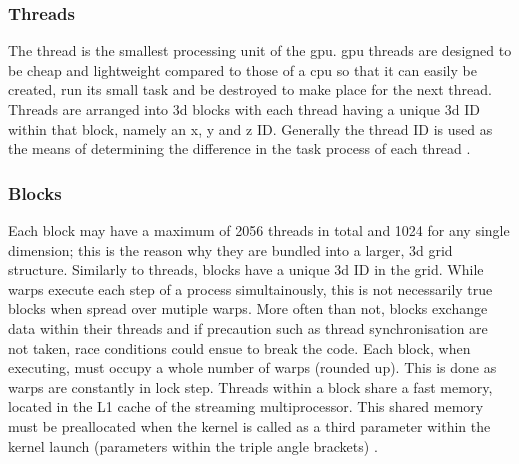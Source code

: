 \subsubsection{Threads}\label{gpu:ssec:thread}
The thread is the smallest processing unit of the \gls{gpu}. \gls{gpu} threads are designed to be cheap and lightweight compared to those of a \gls{cpu} so that it can easily be created, run its small task and be destroyed to make place for the next thread. Threads are arranged into \gls{3d} blocks with each thread having a unique \gls{3d} ID within that block, namely an x, y and z ID. Generally the thread ID is used as the means of determining the difference in the task process of each thread \citep{CUDA}.
%
\subsubsection{Blocks}\label{gpu:ssec:block}
Each block may have a maximum of 2056 threads in total and 1024 for any single dimension; this is the reason why they are bundled into a larger, \gls{3d} grid structure. Similarly to threads, blocks have a unique \gls{3d} ID in the grid. While warps execute each step of a process simultainously, this is not necessarily true blocks when spread over mutiple warps. More often than not, blocks exchange data within their threads and if precaution such as thread synchronisation are not taken, race conditions could ensue to break the code. Each block, when executing, must occupy a whole number of warps (rounded up). This is done as warps are constantly in lock step. Threads within a block share a fast memory, located in the L1 cache of the streaming multiprocessor. This shared memory must be preallocated when the kernel is called as a third parameter within the kernel launch (parameters within the triple angle brackets) \citep{CUDA}.
%
